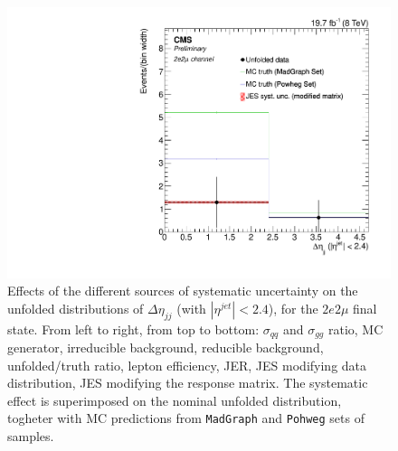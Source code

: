 \begin{figure}[hbtp]
\begin{center}
   \includegraphics[width=0.8\cmsFigWidth]{Figures/Unfolding/Systematics/ZZTo2e2m_CentralDeta_JES_ModMat_Mad_fr}
   \caption{Effects of the different sources of systematic uncertainty on the unfolded distributions of $\Delta\eta_{jj}$ (with $|\eta^{jet}|<2.4$), for the $2e2\mu$ final state. From left to right, from top to bottom: $\sigma_{qq}$ and $\sigma_{gg}$ ratio, MC generator, irreducible background, reducible background, unfolded/truth ratio, lepton efficiency, JER, JES modifying data distribution, JES modifying the response matrix. The systematic effect is superimposed on the nominal unfolded distribution, togheter with MC predictions from \texttt{MadGraph} and \texttt{Pohweg} sets of samples.}
   \label{fig:CentralDetasyst2e2m}
 \end{center}
\end{figure}
\clearpage
